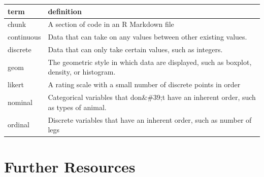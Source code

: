 \documentclass[
  oneside]{book}
\begin{document}
\begin{tabular}{l|l}
\hline
term & definition\\
\hline
chunk & A section of code in an R Markdown file\\
\hline
continuous & Data that can take on any values between other existing values.\\
\hline
discrete & Data that can only take certain values, such as integers.\\
\hline
geom & The geometric style in which data are displayed, such as boxplot, density, or histogram.\\
\hline
likert & A rating scale with a small number of discrete points in order\\
\hline
nominal & Categorical variables that don\&\#39;t have an inherent order, such as types of animal.\\
\hline
ordinal & Discrete variables that have an inherent order, such as number of legs\\
\hline
\end{tabular}

\hypertarget{resources-ggplot}{%
\section{Further Resources}\label{resources-ggplot}}
\end{document}
